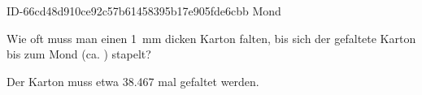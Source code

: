 \begin{exercise}
      {ID-66cd48d910ce92c57b61458395b17e905fde6cbb}
      {Mond}
  \ifproblem\problem\par
    Wie oft muss man einen \SI{1}{\milli\metre} dicken Karton falten,
    bis sich der gefaltete Karton bis zum Mond (ca. )
    stapelt?
  \fi
  \ifoutcome\outcome\par
    Der Karton muss etwa \num{38.467} mal gefaltet werden.
  \fi
\end{exercise}
